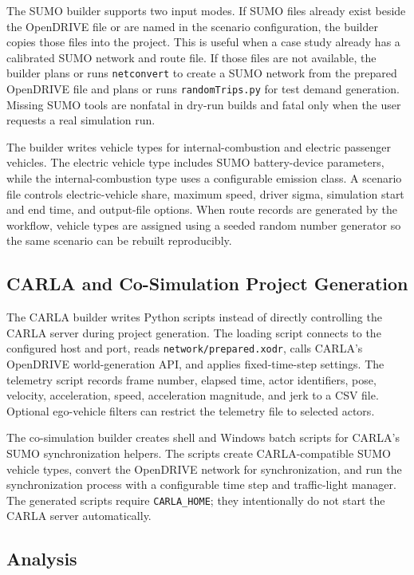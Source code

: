 \documentclass[10pt,numbered]{\selectedmanuscriptclass}
\begin{document}
The SUMO builder supports two input modes. If SUMO files already exist beside
the OpenDRIVE file or are named in the scenario configuration, the builder copies
those files into the project. This is useful when a case study already has a
calibrated SUMO network and route file. If those files are not available, the
builder plans or runs \texttt{netconvert} to create a SUMO network from the
prepared OpenDRIVE file and plans or runs \texttt{randomTrips.py} for test
demand generation. Missing SUMO tools are nonfatal in dry-run builds and fatal
only when the user requests a real simulation run.

The builder writes vehicle types for internal-combustion and electric passenger
vehicles. The electric vehicle type includes SUMO battery-device parameters,
while the internal-combustion type uses a configurable emission class. A
scenario file controls electric-vehicle share, maximum speed, driver sigma,
simulation start and end time, and output-file options. When route records are
generated by the workflow, vehicle types are assigned using a seeded random
number generator so the same scenario can be rebuilt reproducibly.

\subsection{CARLA and Co-Simulation Project Generation}

The CARLA builder writes Python scripts instead of directly controlling the
CARLA server during project generation. The loading script connects to the
configured host and port, reads \texttt{network/prepared.xodr}, calls CARLA's
OpenDRIVE world-generation API, and applies fixed-time-step settings. The
telemetry script records frame number, elapsed time, actor identifiers, pose,
velocity, acceleration, speed, acceleration magnitude, and jerk to a CSV file.
Optional ego-vehicle filters can restrict the telemetry file to selected actors.

The co-simulation builder creates shell and Windows batch scripts for CARLA's
SUMO synchronization helpers. The scripts create CARLA-compatible SUMO vehicle
types, convert the OpenDRIVE network for synchronization, and run the
synchronization process with a configurable time step and traffic-light manager.
The generated scripts require \texttt{CARLA\_HOME}; they intentionally do not
start the CARLA server automatically.

\subsection{Analysis}
\end{document}
